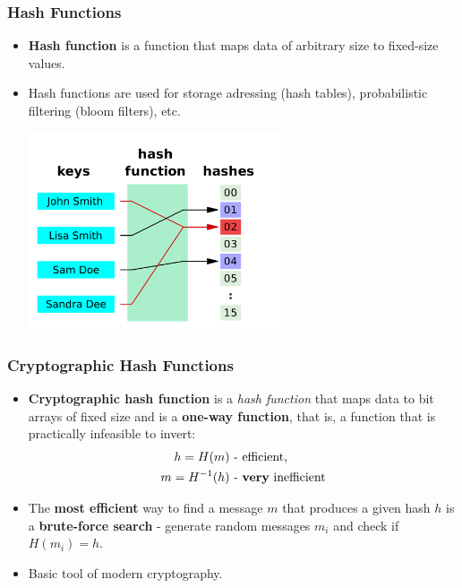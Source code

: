 \documentclass{beamer}
\begin{document}
\begin{frame}
  \frametitle{Hash Functions}
  \begin{itemize}
  \item \textbf{Hash function} is a function that maps data of arbitrary size to
    fixed-size values.
  \item Hash functions are used for storage adressing (hash tables),
    probabilistic filtering (bloom filters), etc.
    \begin{center}
      \includegraphics[width=0.6\textwidth,]{hash_function}
    \end{center}
  \end{itemize}
\end{frame}

\begin{frame}
  \frametitle{Cryptographic Hash Functions}
  \begin{itemize}    
  \item \textbf{Cryptographic hash function} is a \textit{hash function} that
    maps data to bit arrays of fixed size and is a \textbf{one-way function},
    that is, a function that is practically infeasible to invert:
    \begin{align*}
      h = H(m)&\text{ - efficient,}\\
      m = H^{-1}(h)&\text{ - \textbf{very} inefficient}
    \end{align*}
  \item The \textbf{most efficient} way to find a message $m$ that produces a
    given hash $h$ is a \textbf{brute-force search} - generate random messages
    $m_i$ and check if $H(m_i) = h$.
  \item Basic tool of modern cryptography.
  \end{itemize}
\end{frame}
\end{document}
